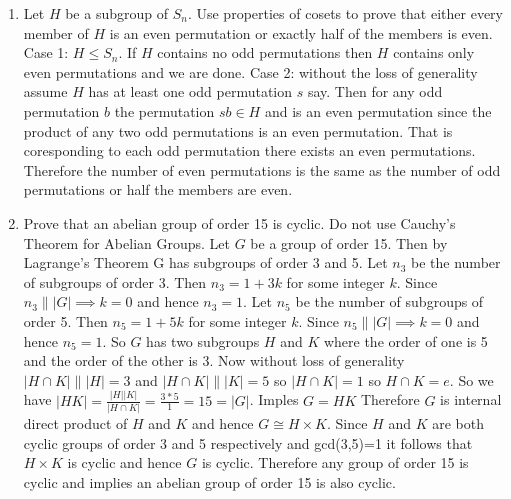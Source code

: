 \documentclass{article}
\begin{document}
\begin{enumerate}
\item Let $H$ be a subgroup of $S_n$. Use properties of cosets to prove that either every member of $H$ is an even permutation or exactly half of the members is even. Case 1: $H \leq S_n$. If $H$ contains no odd permutations then $H$ contains only even permutations and we are done. Case 2: without the loss of generality assume $H$ has at least one odd permutation $s$ say. Then for any odd permutation $b$ the permutation $sb \in H$ and is an even permutation since the product of any two odd permutations is an even permutation. That is coresponding to each odd permutation there exists an even permutations. Therefore the number of even permutations is the same as the number of odd permutations or half the members are even.

\item Prove that an abelian group of order 15 is cyclic. Do not use Cauchy's Theorem for Abelian Groups. Let $G$ be a group of order 15. Then by Lagrange's Theorem G has subgroups of order 3 and 5. Let $n_3$ be the number of subgroups of order 3. Then $n_3 = 1+3k$ for some integer $k$. Since $n_3 \| |G| \implies k = 0$ and hence $n_3 =1$. Let $n_5$ be the number of subgroups of order 5. Then $n_5 = 1+ 5k$ for some integer $k$. Since $n_5 \| |G| \implies k=0$ and hence $n_5 =1$. So $G$ has two subgroups $H$ and $K$ where the order of one is 5 and the order of the other is 3. Now without loss of generality $|H \cap K | \| |H| = 3$ and $|H \cap K | \| |K| = 5$ so  $|H \cap K | = 1$ so $H \cap K = {e}$. So we have $|HK| = \frac{|H||K|}{|H\cap K|} = \frac{3*5}{1} = 15 = |G|$. Imples $G=HK$ Therefore $G$ is internal direct product of $H$ and $K$ and hence $G \cong H \times K$. Since $H$ and $K$ are both cyclic groups of order 3 and 5 respectively and gcd(3,5)=1 it follows that $H \times K$ is cyclic and hence $G$ is cyclic. Therefore any group of order 15 is cyclic and implies an abelian group of order 15 is also cyclic. 

\end{enumerate}
\end{document}
